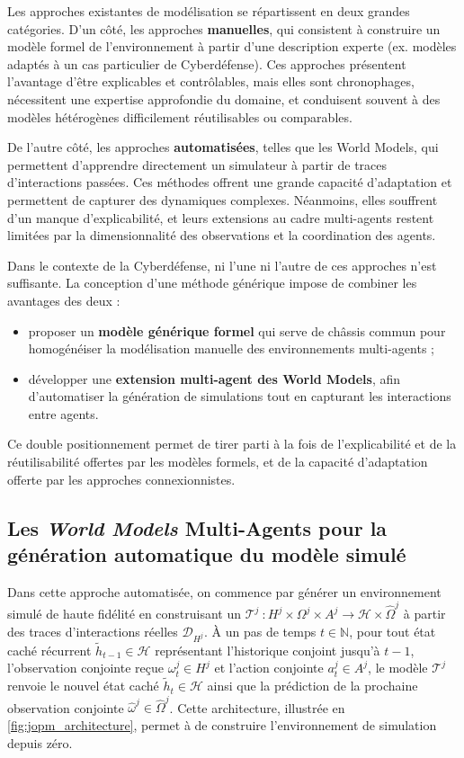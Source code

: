 Les approches existantes de modélisation se répartissent en deux grandes catégories.
D'un côté, les approches \textbf{manuelles}, qui consistent à construire un modèle formel de l'environnement à partir d'une description experte (ex. modèles  adaptés à un cas particulier de Cyberdéfense). Ces approches présentent l'avantage d'être explicables et contrôlables, mais elles sont chronophages, nécessitent une expertise approfondie du domaine, et conduisent souvent à des modèles hétérogènes difficilement réutilisables ou comparables.

De l'autre côté, les approches \textbf{automatisées}, telles que les World Models, qui permettent d'apprendre directement un simulateur à partir de traces d'interactions passées. Ces méthodes offrent une grande capacité d'adaptation et permettent de capturer des dynamiques complexes. Néanmoins, elles souffrent d'un manque d'explicabilité, et leurs extensions au cadre multi-agents restent limitées par la dimensionnalité des observations et la coordination des agents.

Dans le contexte de la Cyberdéfense, ni l'une ni l'autre de ces approches n'est suffisante. La conception d'une méthode générique impose de combiner les avantages des deux :
\begin{itemize}
  \item proposer un \textbf{modèle générique formel} qui serve de châssis commun pour homogénéiser la modélisation manuelle des environnements multi-agents ;
  \item développer une \textbf{extension multi-agent des World Models}, afin d'automatiser la génération de simulations tout en capturant les interactions entre agents.
\end{itemize}

Ce double positionnement permet de tirer parti à la fois de l'explicabilité et de la réutilisabilité offertes par les modèles formels, et de la capacité d'adaptation offerte par les approches connexionnistes.


\subsection{Les \textit{World Models} Multi-Agents pour la génération automatique du modèle simulé}

Dans cette approche automatisée, on commence par générer un environnement simulé de haute fidélité en construisant un  $\mathcal{T}^j~: H^j \times \Omega^j \times A^j \rightarrow \mathcal{H} \times \hat{\Omega}^j$ à partir des traces d'interactions réelles $\mathcal{D}_{H^j}$. À un pas de temps $t \in \mathbb{N}$, pour tout état caché récurrent $\tilde{h}_{t-1} \in \mathcal{H}$ représentant l'historique conjoint jusqu'à $t-1$, l'observation conjointe reçue $\omega_t^j \in H^j$ et l'action conjointe $a_t^j \in A^j$, le modèle $\mathcal{T}^j$ renvoie le nouvel état caché $\tilde{h}_t \in \mathcal{H}$ ainsi que la prédiction de la prochaine observation conjointe $\hat{\omega}^j \in \hat{\Omega}^j$. Cette architecture, illustrée en \autoref{fig:jopm_architecture}, permet à  de construire l'environnement de simulation depuis zéro.

